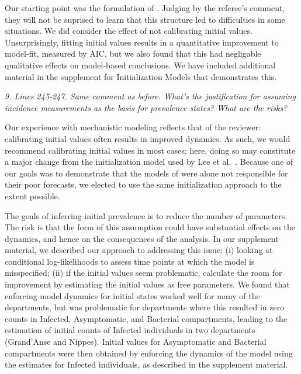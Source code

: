 \documentclass[11pt]{article}
\newcommand\report[1]{{\color{mygreen} \vspace{1mm}\hspace{0.25in}\parbox{6in}{\em #1}}}
\begin{document}
Our starting point was the formulation of \cite{lee20}.
Judging by the referee's comment, they will not be suprised to learn that this structure led to difficulties in some situations. 
We did consider the effect of not calibrating initial values. 
Unsurprisingly, fitting initial values results in a quantitative improvement to model-fit, measured by AIC, but we also found that this had negligable qualitative effects on model-based conclusions. 
We have included additional material in the supplement for Initialization Models that demonstrates this. 

\report{
  9. Lines 245-247. Same comment as before. What’s the justification for assuming incidence measurements as the basis for prevalence states? What are the risks?
}

Our experience with mechanistic modeling reflects that of the reviewer: calibrating initial values often results in improved dynamics. 
As such, we would recommend calibrating initial values in most cases; here, doing so may constitute a major change from the initialization model used by Lee et al.~\cite{lee20}.
Because one of our goals was to demonstrate that the models of \cite{lee20} were alone not responsible for their poor forecasts, we elected to use the same initialization approach to the extent possible. 

The goals of inferring initial prevalence is to reduce the number of parameters. 
The risk is that the form of this assumption could have substantial effects on the dynamics, and hence on the consequences of the analysis.
In our supplement material, we described our approach to addressing this issue: (i) looking at conditional log-likelihoods to assess time points at which the model is misspecified; (ii) if the initial values seem problematic, calculate the room for improvement by estimating the initial values as free parameters.
We found that enforcing model dynamics for initial states worked well for many of the departments, but was problematic for departments where this resulted in zero counts in Infected, Asymptomatic, and Bacterial compartments, leading to the estimation of initial counts of Infected individuals in two departments (Grand'Anse and Nippes). Initial values for Asymptomatic and Bacterial compartments were then obtained by enforcing the dynamics of the model using the estimates for Infected individuals, as described in the supplement material. 
\end{document}
